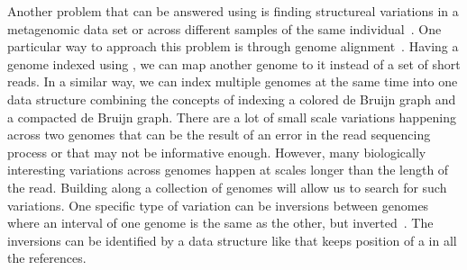 Another problem that can be answered using \pufferfish is finding structureal variations in a metagenomic data set or across different samples of the same individual~\cite{korbel2007paired,tuzun2005fine}. One particular way to approach this problem is through genome alignment~\cite{korbel2007paired}. Having a genome indexed using \pufferfish, we can map another genome to it instead of a set of short reads. In a similar way, we can index multiple genomes at the same time into one data structure combining the concepts of indexing a colored de Bruijn graph and a compacted de Bruijn graph. There are a lot of small scale variations happening across two genomes that can be the result of an error in the read sequencing process or that may not be informative enough. However, many biologically interesting variations across genomes happen at scales longer than the length of the read. Building \pufferfish along a collection of genomes will allow us to search for such variations. One specific type of variation can be inversions between genomes where an interval of one genome is the same as the other, but inverted~\cite{feuk2010inversion,turner2006assaying}.
The inversions can be identified by a data structure like \pufferfish that keeps position of a \kmer in all the references.
